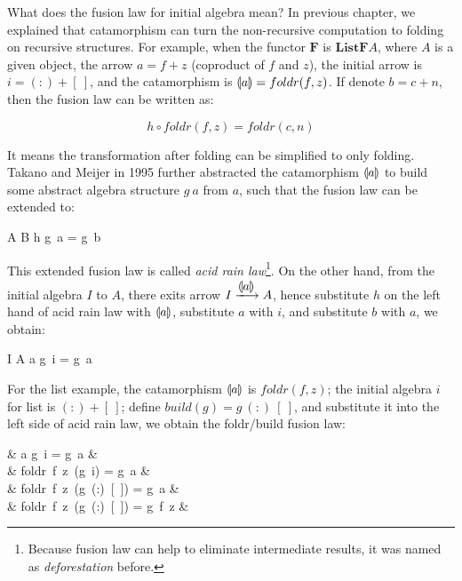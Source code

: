 \documentclass[b5paper]{article}
\begin{document}
What does the fusion law for initial algebra mean? In previous chapter, we explained that catamorphism can turn the non-recursive computation to folding on recursive structures. For example, when the functor $\mathbf{F}$ is $\mathbf{ListF}A$, where $A$ is a given object, the arrow $a = f + z$ (coproduct of $f$ and $z$), the initial arrow is $i = (:) + [\ ]$, and the catamorphism is $\llparenthesis a \rrparenthesis = foldr(f, z)$. If denote $b = c + n$, then the fusion law can be written as:

\[
h \circ foldr(f, z) = foldr(c, n)
\]

It means the transformation after folding can be simplified to only folding. Takano and Meijer in 1995 further abstracted the catamorphism $\llparenthesis a \rrparenthesis$ to build some abstract algebra structure $g\ a$ from $a$, such that the fusion law can be extended to\cite{Takano-Meijer-1995}:

\be
A  B \quad \Rightarrow \quad h \circ g\ a = g\ b
\ee

 
This extended fusion law is called {\em acid rain law}\footnote{Because fusion law can help to eliminate intermediate results, it was named as {\em deforestation} before.}. On the other hand, from the initial algebra $I$ to $A$, there exits arrow $I \arrowto{\lbb a \rbb} A$, hence substitute $h$ on the left hand of acid rain law with $\llparenthesis a \rrparenthesis$, substitute $a$ with $i$, and substitute $b$ with $a$, we obtain:

\be
I  A \quad \Rightarrow \quad \lbb a \rbb \circ g\ i = g\ a
\ee

For the list example, the catamorphism $\llparenthesis a \rrparenthesis$ is $foldr(f, z)$; the initial algebra $i$ for list is $(:) + [\ ]$; define $build(g) = g\ (:)\ [\ ]$, and substitute it into the left side of acid rain law, we obtain the foldr/build fusion law:

\blre
& \lbb a \rbb \circ g\ i = g\ a &  \\

\Rightarrow &
foldr\ f\ z\ (g\ i) = g\ a &  \\

\Rightarrow &
foldr\ f\ z\ (g\ (:)\ [\ ]) = g\ a &  \\

\Rightarrow &
foldr\ f\ z\ (g\ (:)\ [\ ]) = g\ f\ z &  \\
\end{document}
